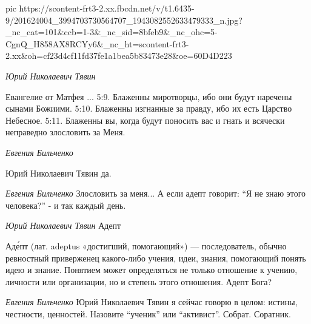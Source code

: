 \ifcmt
  pic https://scontent-frt3-2.xx.fbcdn.net/v/t1.6435-9/201624004_3994703730564707_1943082552633479333_n.jpg?_nc_cat=101&ccb=1-3&_nc_sid=8bfeb9&_nc_ohc=5-CgnQ_H858AX8RCYy6&_nc_ht=scontent-frt3-2.xx&oh=cf23d4cf11fd37fe1a1bea5b83473e28&oe=60D4D223
\fi

\emph{Юрий Николаевич Тявин}

Евангелие от Матфея
...
5:9. Блаженны миротворцы, ибо они будут наречены сынами Божиими.
5:10. Блаженны изгнанные за правду, ибо их есть Царство Небесное.
5:11. Блаженны вы, когда будут поносить вас и гнать
и всячески неправедно злословить за Меня.

\emph{Евгения Бильченко}

Юрий Николаевич Тявин да.

\emph{Евгения Бильченко}
Злословить за меня... А если адепт говорит: \enquote{Я не знаю этого человека?} - и так каждый день.

\emph{Юрий Николаевич Тявин}
Адепт

Аде́пт (лат. adeptus «достигший, помогающий») — последователь, обычно ревностный
приверженец какого-либо учения, идеи, знания, помогающий понять идею и знание.
Понятием может определяться не только отношение к учению, личности или
организации, но и степень этого отношения. Адепт Бога?

\emph{Евгения Бильченко}
Юрий Николаевич Тявин я сейчас говорю в целом: истины, честности, ценностей. Назовите \enquote{ученик} или \enquote{активист}. Собрат. Соратник.
